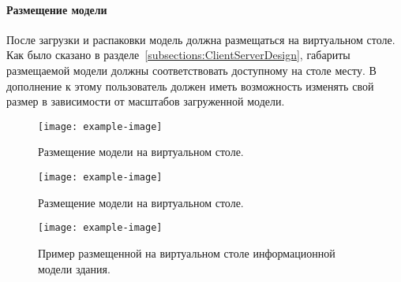 ﻿\paragraph{Размещение модели}

После загрузки и распаковки модель должна размещаться на виртуальном столе.
Как было сказано в разделе~\ref{subsections:ClientServerDesign},
габариты размещаемой модели должны соответствовать доступному на столе месту.
В дополнение к этому пользователь должен иметь возможность изменять
свой размер в зависимости от масштабов загруженной модели.

\begin{figure}[!htp]
    \centering
    \texttt{[image: example-image]}
    \caption{Размещение модели на виртуальном столе.}
    \label{figure:SPlaceModel}
\end{figure}


\begin{figure}[!htp]
    \centering
    \texttt{[image: example-image]}
    \caption{Размещение модели на виртуальном столе.}
    \label{figure:SSetUserSize}
\end{figure}


\begin{figure}[!htp]
    \centering
    \texttt{[image: example-image]}
    \caption{Пример размещенной на виртуальном столе
    информационной модели здания.}
    \label{figure:PlacedModelExample}
\end{figure}

